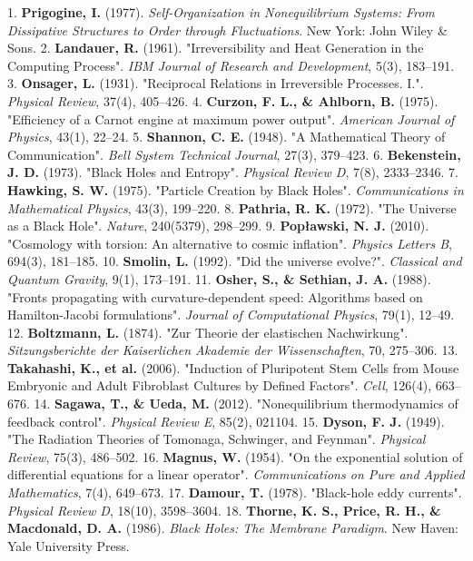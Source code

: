 \documentclass[11pt,a4paper]{article}
\theoremstyle{definition}
\theoremstyle{remark}
\begin{document}
1. \textbf{Prigogine, I.} (1977). \textit{Self-Organization in Nonequilibrium Systems: From Dissipative Structures to Order through Fluctuations}. New York: John Wiley \& Sons.
2. \textbf{Landauer, R.} (1961). "Irreversibility and Heat Generation in the Computing Process". \textit{IBM Journal of Research and Development}, 5(3), 183–191.
3. \textbf{Onsager, L.} (1931). "Reciprocal Relations in Irreversible Processes. I.". \textit{Physical Review}, 37(4), 405–426.
4. \textbf{Curzon, F. L., \& Ahlborn, B.} (1975). "Efficiency of a Carnot engine at maximum power output". \textit{American Journal of Physics}, 43(1), 22–24.
5. \textbf{Shannon, C. E.} (1948). "A Mathematical Theory of Communication". \textit{Bell System Technical Journal}, 27(3), 379–423.
6. \textbf{Bekenstein, J. D.} (1973). "Black Holes and Entropy". \textit{Physical Review D}, 7(8), 2333–2346.
7. \textbf{Hawking, S. W.} (1975). "Particle Creation by Black Holes". \textit{Communications in Mathematical Physics}, 43(3), 199–220.
8. \textbf{Pathria, R. K.} (1972). "The Universe as a Black Hole". \textit{Nature}, 240(5379), 298–299.
9. \textbf{Popławski, N. J.} (2010). "Cosmology with torsion: An alternative to cosmic inflation". \textit{Physics Letters B}, 694(3), 181–185.
10. \textbf{Smolin, L.} (1992). "Did the universe evolve?". \textit{Classical and Quantum Gravity}, 9(1), 173–191.
11. \textbf{Osher, S., \& Sethian, J. A.} (1988). "Fronts propagating with curvature-dependent speed: Algorithms based on Hamilton-Jacobi formulations". \textit{Journal of Computational Physics}, 79(1), 12–49.
12. \textbf{Boltzmann, L.} (1874). "Zur Theorie der elastischen Nachwirkung". \textit{Sitzungsberichte der Kaiserlichen Akademie der Wissenschaften}, 70, 275–306.
13. \textbf{Takahashi, K., et al.} (2006). "Induction of Pluripotent Stem Cells from Mouse Embryonic and Adult Fibroblast Cultures by Defined Factors". \textit{Cell}, 126(4), 663–676.
14. \textbf{Sagawa, T., \& Ueda, M.} (2012). "Nonequilibrium thermodynamics of feedback control". \textit{Physical Review E}, 85(2), 021104.
15. \textbf{Dyson, F. J.} (1949). "The Radiation Theories of Tomonaga, Schwinger, and Feynman". \textit{Physical Review}, 75(3), 486–502.
16. \textbf{Magnus, W.} (1954). "On the exponential solution of differential equations for a linear operator". \textit{Communications on Pure and Applied Mathematics}, 7(4), 649–673.
17. \textbf{Damour, T.} (1978). "Black-hole eddy currents". \textit{Physical Review D}, 18(10), 3598–3604.
18. \textbf{Thorne, K. S., Price, R. H., \& Macdonald, D. A.} (1986). \textit{Black Holes: The Membrane Paradigm}. New Haven: Yale University Press.
\end{document}
